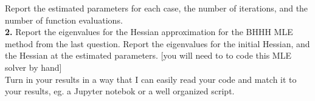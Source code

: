 \documentclass[10pt]{article}
\begin{document}
Report the estimated parameters for each case, the number of iterations, and the number of function evaluations.\\

\noindent \textbf{2.} Report the eigenvalues for the Hessian approximation for the BHHH MLE method from the last question. Report the eigenvalues for the initial Hessian, and the Hessian at the estimated parameters. [you will need to to code this MLE solver by hand]  \\




\noindent
Turn in your results in a way that I can easily read your code and match it to your results, eg. a Jupyter notebok or a well organized script.
\end{document}

